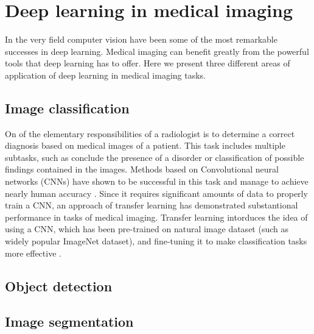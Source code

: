 


\section{Deep learning in medical imaging}
In the very field computer vision have been some of the most remarkable successes in deep learning. Medical imaging can benefit greatly from the powerful tools that deep learning has to offer. Here we present three different areas of application of deep learning in medical imaging tasks.
\subsection{Image classification}
On of the elementary responsibilities of a radiologist is to determine a correct diagnosis based on medical images of a patient. This task includes multiple subtasks, such as conclude the presence of a disorder or classification of possible findings contained in the images. Methods based on Convolutional neural networks (CNNs) have shown to be successful in this task and manage to achieve nearly human accuracy \cite{deeplearningHealthcare}. Since it requires significant amounts of data to properly train a CNN, an approach of transfer learning has demonstrated substantional performance in tasks of medical imaging. Transfer learning intorduces the idea of using a CNN, which has been pre-trained on natural image dataset (such as widely popular ImageNet dataset), and fine-tuning it to make classification tasks more effective \cite{IEEEtransfer}.
\subsection{Object detection}
\subsection{Image segmentation}